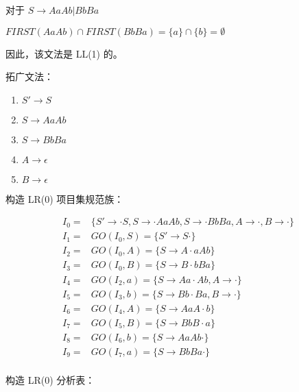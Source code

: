 \begin{enumerate}
    对于 $S \to AaAb | BbBa $
    
    $ FIRST(AaAb) \cap FIRST(BbBa) = \{a\} \cap \{b\} = \emptyset $
    
    因此，该文法是 LL(1) 的。
    
    拓广文法：
    
    \begin{enumerate}[(1)]
        \item $S' \to S$
        \item $S \to AaAb$
        \item $S \to BbBa$
        \item $A \to \epsilon$
        \item $B \to \epsilon$
    \end{enumerate}
    
    构造 LR(0) 项目集规范族：
    
    \begin{equation*}
        \begin{array}{cl}
            I_0 = & \{S' \to \cdot S, S \to \cdot AaAb, S \to \cdot BbBa, A \to \cdot, B \to \cdot \} \\
            \hline
            I_1 = & GO(I_0, S) = \{S' \to S \cdot \} \\
            I_2 = & GO(I_0, A) = \{S \to A \cdot aAb \} \\
            I_3 = & GO(I_0, B) = \{S \to B \cdot bBa \} \\
            \hline
            I_4 = & GO(I_2, a) = \{S \to Aa \cdot Ab, A \to \cdot\} \\
            \hline
            I_5 = & GO(I_3, b) = \{S \to Bb \cdot Ba, B \to \cdot\} \\
            \hline
            I_6 = & GO(I_4, A) = \{S \to AaA \cdot b\} \\
            \hline
            I_7 = & GO(I_5, B) = \{S \to BbB \cdot a\} \\
            \hline
            I_8 = & GO(I_6, b) = \{S \to AaAb \cdot\} \\
            \hline
            I_9 = & GO(I_7, a) = \{S \to BbBa \cdot\} \\
        \end{array}
    \end{equation*}
    
    构造 LR(0) 分析表：
    

\end{enumerate}
